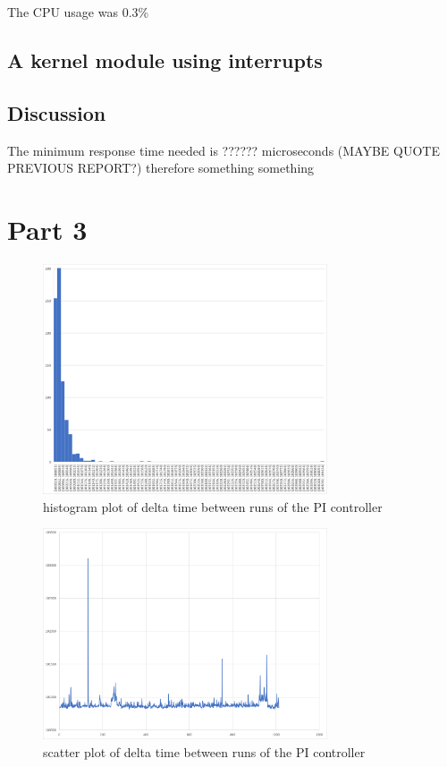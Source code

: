 \documentclass{article}
\begin{document}
The CPU usage was 0.3\%

\subsection{A kernel module using interrupts}





\subsection{Discussion}
The minimum response time needed is ?????? microseconds (MAYBE QUOTE PREVIOUS REPORT?) therefore something something

\section{Part 3}

\begin{figure}[h!]
    \centering
    \includegraphics[width=0.75\textwidth]{Project4KernelSpaceEncoderDriver/histogram_timebetweenruns.png}
    \caption{histogram plot of delta time between runs of the PI controller}
    \label{fig:histogramDelta}
\end{figure}
\begin{figure}[h!]
    \centering
    \includegraphics[width=0.75\textwidth]{Project4KernelSpaceEncoderDriver/scatterplot_between_runs.png}
    \caption{scatter plot of delta time between runs of the PI controller}
    \label{fig:scatterplotDelta}
\end{figure}
\newpage
\end{document}
